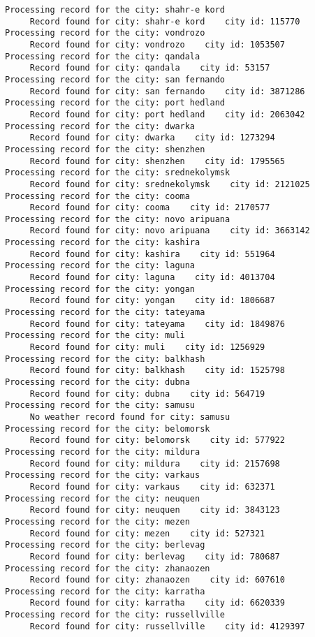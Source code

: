\documentclass[11pt]{article}
\begin{document}
\begin{Verbatim}[commandchars=\\\{\}]
Processing record for the city: shahr-e kord
     Record found for city: shahr-e kord    city id: 115770
Processing record for the city: vondrozo
     Record found for city: vondrozo    city id: 1053507
Processing record for the city: qandala
     Record found for city: qandala    city id: 53157
Processing record for the city: san fernando
     Record found for city: san fernando    city id: 3871286
Processing record for the city: port hedland
     Record found for city: port hedland    city id: 2063042
Processing record for the city: dwarka
     Record found for city: dwarka    city id: 1273294
Processing record for the city: shenzhen
     Record found for city: shenzhen    city id: 1795565
Processing record for the city: srednekolymsk
     Record found for city: srednekolymsk    city id: 2121025
Processing record for the city: cooma
     Record found for city: cooma    city id: 2170577
Processing record for the city: novo aripuana
     Record found for city: novo aripuana    city id: 3663142
Processing record for the city: kashira
     Record found for city: kashira    city id: 551964
Processing record for the city: laguna
     Record found for city: laguna    city id: 4013704
Processing record for the city: yongan
     Record found for city: yongan    city id: 1806687
Processing record for the city: tateyama
     Record found for city: tateyama    city id: 1849876
Processing record for the city: muli
     Record found for city: muli    city id: 1256929
Processing record for the city: balkhash
     Record found for city: balkhash    city id: 1525798
Processing record for the city: dubna
     Record found for city: dubna    city id: 564719
Processing record for the city: samusu
     No weather record found for city: samusu
Processing record for the city: belomorsk
     Record found for city: belomorsk    city id: 577922
Processing record for the city: mildura
     Record found for city: mildura    city id: 2157698
Processing record for the city: varkaus
     Record found for city: varkaus    city id: 632371
Processing record for the city: neuquen
     Record found for city: neuquen    city id: 3843123
Processing record for the city: mezen
     Record found for city: mezen    city id: 527321
Processing record for the city: berlevag
     Record found for city: berlevag    city id: 780687
Processing record for the city: zhanaozen
     Record found for city: zhanaozen    city id: 607610
Processing record for the city: karratha
     Record found for city: karratha    city id: 6620339
Processing record for the city: russellville
     Record found for city: russellville    city id: 4129397

\end{Verbatim}
\end{document}
